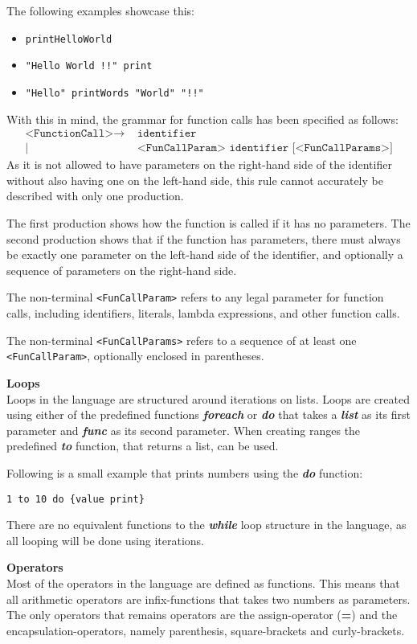 The following examples showcase this:
\begin{itemize}
	\item \texttt{printHelloWorld}
	\item \texttt{"Hello World !!" print}
	\item \texttt{"Hello" printWords "World" "!!"}
\end{itemize}
With this in mind, the grammar for function calls has been specified as follows:
\begin{align*}
	\texttt{<FunctionCall>}\to & \texttt{ identifier}\\
	| & \texttt{ <FunCallParam> identifier [<FunCallParams>]}
\end{align*}
As it is not allowed to have parameters on the right-hand side of the identifier without also having one on the left-hand side, this rule cannot accurately be described with only one production.

The first production shows how the function is called if it has no parameters.
The second production shows that if the function has parameters, there must always be exactly one parameter on the left-hand side of the identifier, and optionally a sequence of parameters on the right-hand side.

The non-terminal \texttt{<FunCallParam>} refers to any legal parameter for function calls, including identifiers, literals, lambda expressions, and other function calls.

The non-terminal \texttt{<FunCallParams>} refers to a sequence of at least one \texttt{<FunCallParam>}, optionally enclosed in parentheses.

\textbf{Loops}\\
Loops in the language are structured around iterations on lists.
Loops are created using either of the predefined functions \textbf{\textit{foreach}} or \textbf{\textit{do}} that takes a \textbf{\textit{list}} as its first parameter and \textbf{\textit{func}} as its second parameter.
When creating ranges the predefined \textbf{\textit{to}} function, that returns a list, can be used. 

Following is a small example that prints numbers using the \textbf{\textit{do}} function:
\begin{lstlisting}
1 to 10 do {value print}
\end{lstlisting}
There are no equivalent functions to the \textbf{\textit{while}} loop structure in the language, as all looping will be done using iterations.

\textbf{Operators}\\
Most of the operators in the language are defined as functions.
This means that all arithmetic operators are infix-functions that takes two numbers as parameters. 
The only operators that remains operators are the assign-operator (\textbf{=}) and the encapsulation-operators, namely parenthesis, square-brackets and curly-brackets.

